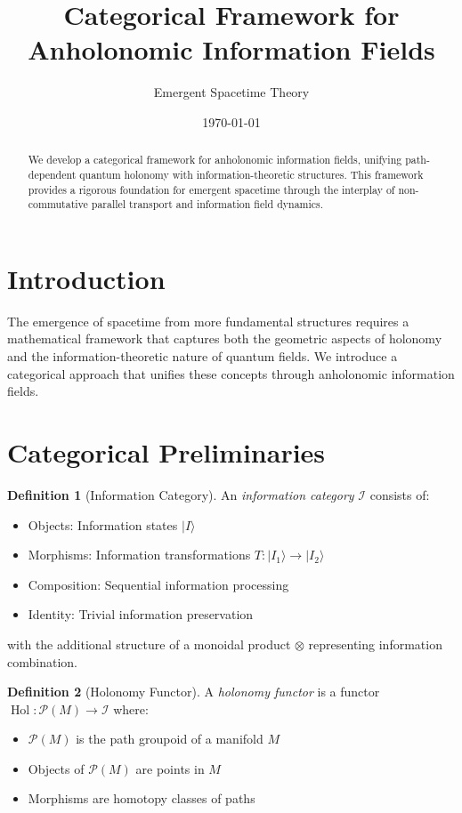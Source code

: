 \documentclass[11pt]{article}
\title{Categorical Framework for Anholonomic Information Fields}
\author{Emergent Spacetime Theory}
\date{\today}
\theoremstyle{definition}
\newtheorem{definition}{Definition}
\DeclareMathOperator{\Hol}{Hol}
\begin{document}
\maketitle

\begin{abstract}
We develop a categorical framework for anholonomic information fields, unifying path-dependent quantum holonomy with information-theoretic structures. This framework provides a rigorous foundation for emergent spacetime through the interplay of non-commutative parallel transport and information field dynamics.
\end{abstract}

\section{Introduction}

The emergence of spacetime from more fundamental structures requires a mathematical framework that captures both the geometric aspects of holonomy and the information-theoretic nature of quantum fields. We introduce a categorical approach that unifies these concepts through anholonomic information fields.

\section{Categorical Preliminaries}

\begin{definition}[Information Category]
An \emph{information category} $\mathcal{I}$ consists of:
\begin{itemize}
\item Objects: Information states $|I\rangle$
\item Morphisms: Information transformations $T: |I_1\rangle \to |I_2\rangle$
\item Composition: Sequential information processing
\item Identity: Trivial information preservation
\end{itemize}
with the additional structure of a monoidal product $\otimes$ representing information combination.
\end{definition}

\begin{definition}[Holonomy Functor]
A \emph{holonomy functor} is a functor $\Hol: \mathcal{P}(M) \to \mathcal{I}$ where:
\begin{itemize}
\item $\mathcal{P}(M)$ is the path groupoid of a manifold $M$
\item Objects of $\mathcal{P}(M)$ are points in $M$
\item Morphisms are homotopy classes of paths
\end{itemize}
\end{definition}
\end{document}
